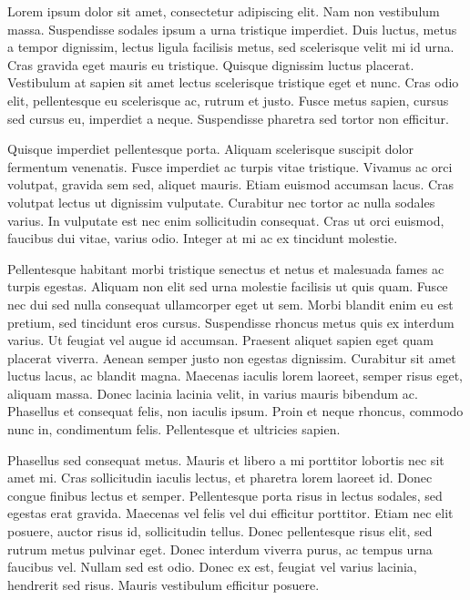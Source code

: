 Lorem ipsum dolor sit amet, consectetur adipiscing elit. Nam non vestibulum massa. 
Suspendisse sodales ipsum a urna tristique imperdiet. Duis luctus, metus a tempor
dignissim, lectus ligula facilisis metus, sed scelerisque velit mi id urna. Cras
gravida eget mauris eu tristique. Quisque dignissim luctus placerat. Vestibulum
at sapien sit amet lectus scelerisque tristique eget et nunc. Cras odio elit,
pellentesque eu scelerisque ac, rutrum et justo. Fusce metus sapien, cursus sed
cursus eu, imperdiet a neque. Suspendisse pharetra sed tortor non efficitur.

Quisque imperdiet pellentesque porta. Aliquam scelerisque suscipit dolor
fermentum venenatis. Fusce imperdiet ac turpis vitae tristique. Vivamus
ac orci volutpat, gravida sem sed, aliquet mauris. Etiam euismod accumsan
lacus. Cras volutpat lectus ut dignissim vulputate. Curabitur nec tortor ac
nulla sodales varius. In vulputate est nec enim sollicitudin consequat.
Cras ut orci euismod, faucibus dui vitae, varius odio. Integer at mi ac ex
tincidunt molestie.

Pellentesque habitant morbi tristique senectus et netus et malesuada fames
ac turpis egestas. Aliquam non elit sed urna molestie facilisis ut quis quam.
Fusce nec dui sed nulla consequat ullamcorper eget ut sem. Morbi blandit enim
eu est pretium, sed tincidunt eros cursus. Suspendisse rhoncus metus quis ex
interdum varius. Ut feugiat vel augue id accumsan. Praesent aliquet sapien eget
quam placerat viverra. Aenean semper justo non egestas dignissim. Curabitur sit
amet luctus lacus, ac blandit magna. Maecenas iaculis lorem laoreet, semper
risus eget, aliquam massa. Donec lacinia lacinia velit, in varius mauris
bibendum ac. Phasellus et consequat felis, non iaculis ipsum. Proin et neque
rhoncus, commodo nunc in, condimentum felis. Pellentesque et ultricies sapien.

Phasellus sed consequat metus. Mauris et libero a mi porttitor lobortis nec sit
amet mi. Cras sollicitudin iaculis lectus, et pharetra lorem laoreet id. Donec
congue finibus lectus et semper. Pellentesque porta risus in lectus sodales, sed
egestas erat gravida. Maecenas vel felis vel dui efficitur porttitor. Etiam nec
elit posuere, auctor risus id, sollicitudin tellus. Donec pellentesque risus
elit, sed rutrum metus pulvinar eget. Donec interdum viverra purus, ac tempus
urna faucibus vel. Nullam sed est odio. Donec ex est, feugiat vel varius
lacinia, hendrerit sed risus. Mauris vestibulum efficitur posuere.


